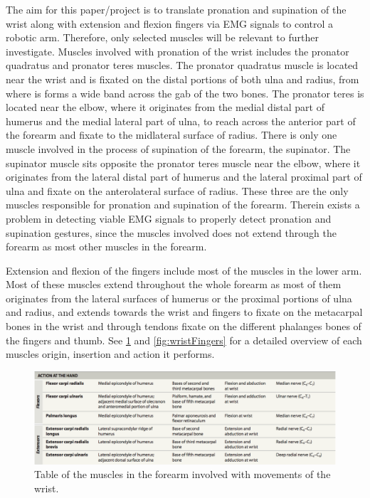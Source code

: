 The aim for this paper/project is to translate pronation and supination of the wrist along with extension and flexion fingers via EMG signals to control a robotic arm. Therefore, only selected muscles will be relevant to further investigate. 
Muscles involved with pronation of the wrist includes the pronator quadratus and pronator teres muscles. The pronator quadratus muscle is located near the wrist and is fixated on the distal portions of both ulna and radius, from where is forms a wide band across the gab of the two bones. The pronator teres is located near the elbow, where it originates  from the medial distal part of humerus and the medial lateral part of ulna, to reach across the anterior part of the forearm and fixate to the midlateral surface of radius. 
There is only one muscle involved in the process of supination of the forearm, the supinator. The supinator muscle sits opposite the pronator teres muscle near the elbow, where it originates from the lateral distal part of humerus and the lateral proximal part of ulna and fixate on the anterolateral surface of radius. 
These three are the only muscles responsible for pronation and supination of the forearm. Therein exists a problem in detecting viable EMG signals to properly detect pronation and supination gestures, since the muscles involved does not extend through the forearm as most other muscles in the forearm. \cite{martini}

Extension and flexion of the fingers include most of the muscles in the lower arm. Most of these muscles extend throughout the whole forearm as most of them originates from the lateral surfaces of humerus or the proximal portions of ulna and radius, and extends towards the wrist and fingers to fixate on the metacarpal bones in the wrist and through tendons fixate on the different phalanges bones of the fingers and thumb. See \ref{fig:wrist} and \ref{fig:wristFingers} for a detailed overview of each muscles origin, insertion and action it performs. \cite{martini}

\begin{figure}[H]
	\includegraphics[width=.4\textwidth]{figures/Anatomy/wrist}  %
	\caption{Table of the muscles in the forearm involved with movements of the wrist. \cite{martini}}
	\label{fig:wrist}  %
\end{figure}

